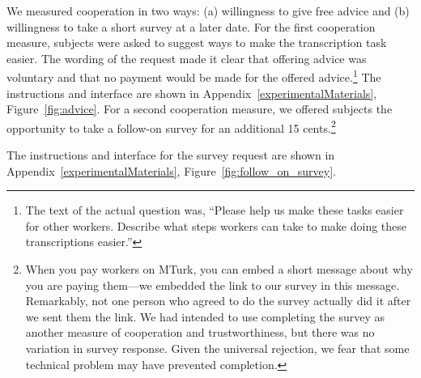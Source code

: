 \documentclass[11pt]{article}
\begin{document}
We measured cooperation in two ways: (a) willingness to give free advice and (b) willingness to take a short survey at a later date.
For the first cooperation measure, subjects were asked to suggest ways to make the transcription task easier.
The wording of the request made it clear that offering advice was voluntary and that no payment would be made for the offered advice.\footnote{
  The text of the actual question was, ``Please help us make these tasks easier for other workers. Describe what steps workers can take to make doing these transcriptions easier.''} 
The instructions and interface are shown in Appendix~\ref{experimentalMaterials}, Figure~\ref{fig:advice}. 
For a second cooperation measure, we offered subjects the opportunity to take a follow-on survey for an additional 15 cents.\footnote{
  When you pay workers on MTurk, you can embed a short message about why you are paying them---we embedded the link to our survey in this message.
  Remarkably, not one person who agreed to do the survey actually did it after we sent them the link.
  We had intended to use completing the survey as another measure of cooperation and trustworthiness, but there was no variation in survey response.
  Given the universal rejection, we fear that some technical problem may have prevented completion.
} 

The instructions and interface for the survey request are shown in Appendix~\ref{experimentalMaterials}, Figure~\ref{fig:follow_on_survey}. 
\end{document}
